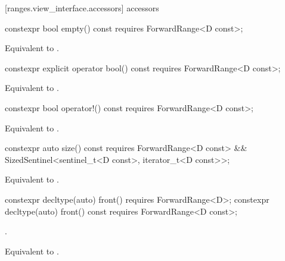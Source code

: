 [ranges.view_interface.accessors]{ accessors}

%
\begin{itemdecl}
constexpr bool empty() const requires ForwardRange<D const>;
\end{itemdecl}

\begin{itemdescr}
\pnum
\returns Equivalent to .
\end{itemdescr}

%
\begin{itemdecl}
constexpr explicit operator bool() const requires ForwardRange<D const>;
\end{itemdecl}

\begin{itemdescr}
\pnum
\returns Equivalent to .
\end{itemdescr}

%
\begin{itemdecl}
constexpr bool operator!() const requires ForwardRange<D const>;
\end{itemdecl}

\begin{itemdescr}
\pnum
\returns Equivalent to .
\end{itemdescr}

%
\begin{itemdecl}
constexpr auto size() const requires ForwardRange<D const> &&
  SizedSentinel<sentinel_t<D const>, iterator_t<D const>>;
\end{itemdecl}

\begin{itemdescr}
\pnum
\returns Equivalent to .
\end{itemdescr}

%
\begin{itemdecl}
constexpr decltype(auto) front() requires ForwardRange<D>;
constexpr decltype(auto) front() const requires ForwardRange<D const>;
\end{itemdecl}

\begin{itemdescr}
\pnum
\requires {}.

\pnum
\returns Equivalent to .
\end{itemdescr}

